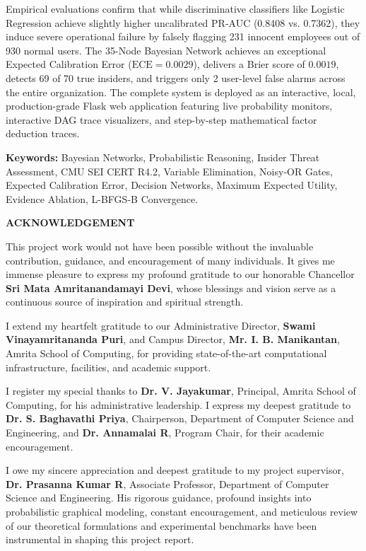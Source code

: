 \documentclass[12pt,a4paper]{report}
\begin{document}
Empirical evaluations confirm that while discriminative classifiers like Logistic Regression achieve slightly higher uncalibrated PR-AUC (0.8408 vs. 0.7362), they induce severe operational failure by falsely flagging 231 innocent employees out of 930 normal users. The 35-Node Bayesian Network achieves an exceptional Expected Calibration Error ($\text{ECE} = 0.0029$), delivers a Brier score of $0.0019$, detects 69 of 70 true insiders, and triggers only 2 user-level false alarms across the entire organization. The complete system is deployed as an interactive, local, production-grade Flask web application featuring live probability monitors, interactive DAG trace visualizers, and step-by-step mathematical factor deduction traces.

\vspace{0.8cm}
\noindent\textbf{Keywords:} Bayesian Networks, Probabilistic Reasoning, Insider Threat Assessment, CMU SEI CERT R4.2, Variable Elimination, Noisy-OR Gates, Expected Calibration Error, Decision Networks, Maximum Expected Utility, Evidence Ablation, L-BFGS-B Convergence.

\newpage
\begin{center}
{\fontsize{13}{16}\bfseries ACKNOWLEDGEMENT\par}
\end{center}
\vspace{0.6cm}

This project work would not have been possible without the invaluable contribution, guidance, and encouragement of many individuals. It gives me immense pleasure to express my profound gratitude to our honorable Chancellor \textbf{Sri Mata Amritanandamayi Devi}, whose blessings and vision serve as a continuous source of inspiration and spiritual strength.

I extend my heartfelt gratitude to our Administrative Director, \textbf{Swami Vinayamritananda Puri}, and Campus Director, \textbf{Mr. I. B. Manikantan}, Amrita School of Computing, for providing state-of-the-art computational infrastructure, facilities, and academic support.

I register my special thanks to \textbf{Dr. V. Jayakumar}, Principal, Amrita School of Computing, for his administrative leadership. I express my deepest gratitude to \textbf{Dr. S. Baghavathi Priya}, Chairperson, Department of Computer Science and Engineering, and \textbf{Dr. Annamalai R}, Program Chair, for their academic encouragement.

I owe my sincere appreciation and deepest gratitude to my project supervisor, \textbf{Dr. Prasanna Kumar R}, Associate Professor, Department of Computer Science and Engineering. His rigorous guidance, profound insights into probabilistic graphical modeling, constant encouragement, and meticulous review of our theoretical formulations and experimental benchmarks have been instrumental in shaping this project report.
\end{document}

